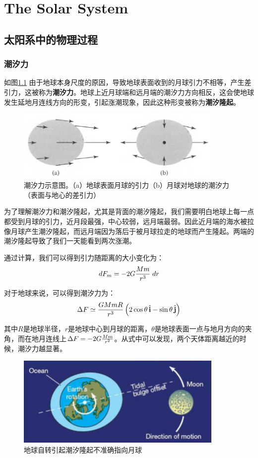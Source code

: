 \documentclass[openany]{ctexbook}
\begin{document}
\part{The Solar System}
\chapter{太阳系中的物理过程}
\section{潮汐力}
如图\ref{fig:tidalforce} 由于地球本身尺度的原因，导致地球表面收到的月球引力不相等，产生差引力，这被称为\textbf{潮汐力}。地球上近月球端和远月端的潮汐力方向相反，这会使地球发生延地月连线方向的形变，引起涨潮现象，因此这种形变被称为\textbf{潮汐隆起}。

\begin{figure}[hbt]
  \centering
  \includegraphics[width=10cm]{chapters/19/tidalforce}
  \caption{潮汐力示意图。（a）地球表面月球的引力（b）月球对地球的潮汐力（表面与地心的差引力）}
  \label{fig:tidalforce}
\end{figure}

为了理解潮汐力和潮汐隆起，尤其是背面的潮汐隆起，我们需要明白地球上每一点都受到月球的引力，近月段最强，中心较弱，远月端最弱。因此近月端的海水被拉像月球产生潮汐隆起，而远月端因为落后于被月球拉走的地球而产生隆起。两端的潮汐隆起导致了我们一天能看到两次涨潮。

通过计算，我们可以得到引力随距离的大小变化为：
\begin{equation}
  dF_m=-2G{Mm\over r^3}\;dr
\end{equation}

对于地球来说，可以得到潮汐力为：
\begin{equation}
  \Delta F\simeq{GMmR\over r^3}\left(2\cos\theta\,\hat{\mathbf i}-\sin\theta\,\hat{\mathbf j}\right)
\end{equation}

其中$R$是地球半径，$r$是地球中心到月球的距离，$\theta$是地球表面一点与地月方向的夹角，而在地月连线上$\Delta F=-2G{Mm\over r^2}$。从式中可以发现，两个天体距离越近的时候，潮汐力越显著。

\begin{figure}[hbt]
  \centering
  \includegraphics[width=10cm]{chapters/19/tidalbulge}
  \caption{地球自转引起潮汐隆起不准确指向月球}
  \label{fig:tidalbulge}
\end{figure}
\end{document}
